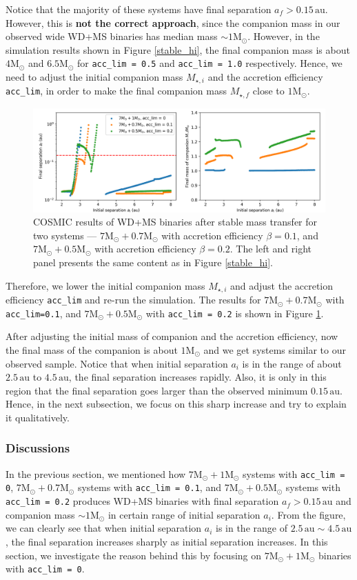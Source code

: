 \documentclass[12pt]{article}
\newcommand{\Msun}{\mathrm{M_{\odot}}}
\newcommand{\au}{\, \mathrm{au}}
\begin{document}
Notice that the majority of these systems have final separation $a_f > 0.15 \au$. However, this is \textbf{not the correct approach}, since the companion mass in our observed wide WD+MS binaries has median mass $\sim 1\Msun$. However, in the simulation results shown in Figure \ref{stable_hi}, the final companion mass is about $4 \Msun$ and $6.5\Msun$ for \verb|acc_lim = 0.5| and \verb|acc_lim = 1.0| respectively. Hence, we need to adjust the  initial companion mass $M_{\star, i}$ and the accretion efficiency \verb|acc_lim|, in order to make the final companion mass $M_{\star, f}$ close to $1\Msun$.

\begin{figure}
    \centering
    \includegraphics[width = 0.75\linewidth]{stable7+1ex.png}
    \caption{COSMIC results of WD+MS binaries after stable mass transfer for two systems — $7\Msun + 0.7\Msun$ with accretion efficiency $\beta = 0.1$, and $7\Msun + 0.5\Msun$ with accretion efficiency $\beta = 0.2$. The left and right panel presents the same content as in Figure \ref{stable_hi}.}
    \label{stable_hi_ex}
\end{figure}

Therefore, we lower the initial companion mass $M_{\star, i}$ and adjust the accretion efficiency \verb|acc_lim| and re-run the simulation. The results for $7\Msun + 0.7\Msun$ with \verb|acc_lim=0.1|, and $7\Msun + 0.5\Msun$ with \verb|acc_lim = 0.2| is shown in Figure \ref{stable_hi_ex}.

After adjusting the initial mass of companion and the accretion efficiency, now the final mass of the companion is about $1\Msun$ and we get systems similar to our observed sample. Notice that when initial separation $a_i$ is in the range of about $2.5 \au$ to $4.5 \au$, the final separation increases rapidly. Also, it is only in this region that the final separation goes larger than the observed minimum $0.15 \au$. Hence, in the next subsection, we focus on this sharp increase and try to explain it qualitatively.

\subsubsection{Discussions}
In the previous section, we mentioned how $7\Msun + 1 \Msun$ systems with \verb|acc_lim = 0|, $7 \Msun + 0.7\Msun$ systems with \verb|acc_lim = 0.1|, and $7 \Msun + 0.5 \Msun$ systems with \verb|acc_lim = 0.2| produces WD+MS binaries with final separation $a_f > 0.15 \au$ and companion mass $\sim 1 \Msun$ in certain range of initial separation $a_i$. From the figure, we can clearly see that when initial separation $a_i$ is in the range of $2.5 \au \sim 4.5\au$, the final separation increases sharply as initial separation increases. In this section, we investigate the reason behind this by focusing on $7\Msun + 1\Msun$ binaries with \verb|acc_lim = 0|.
\end{document}
